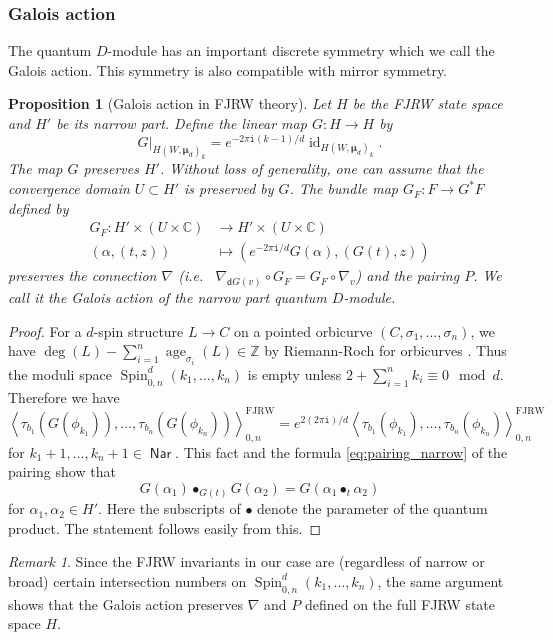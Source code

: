 \documentclass[11pt]{amsart}
\newtheorem{pro}[thm]{Proposition} %
\theoremstyle{definition} %
\theoremstyle{remark} %
\newtheorem{rem}[thm]{Remark}%
\newcommand{\CC}{\mathbb C}
\newcommand{\ZZ}{\mathbb Z}
\newcommand{\id}{\operatorname{id}}
\newcommand{\age}{\operatorname{age}}
\def\corr#1{\left\langle #1 \right\rangle}
\newcommand{\bmu}{\boldsymbol{\mu}}
\newcommand{\dd}{\mathsf{d}}
\newcommand{\Nar}{\operatorname{\mathsf{Nar}}}
\newcommand{\FJRW}{{\operatorname{FJRW}}}
\newcommand{\Spin}{\operatorname{Spin}}
\newcommand{\iu}{\mathtt{i}}
\begin{document}
\subsubsection{Galois action} 
\label{subsubsec:Galois} 
The quantum $D$-module has an important discrete symmetry 
which we call the Galois action. This symmetry 
is also compatible with mirror symmetry. 
\begin{pro}[Galois action in FJRW theory]  
\label{pro:Galois-FJRW} 
Let $H$ be the FJRW state space and $H'$ be its narrow part. 
Define the linear map $G\colon H \to H$ by 
\[
G|_{H(W,\bmu_d)_k} = e^{-2\pi\iu (k-1)/d} \id_{H(W,\bmu_d)_k}. 
\]
The map $G$ preserves $H'$. 
Without loss of generality, one can assume that 
the convergence domain $U\subset H'$ is preserved by $G$. 
The bundle map $G_F\colon F\to G^* F$ defined by  
\begin{align*}
G_F \colon H' \times (U\times \CC) & \longrightarrow 
H'\times (U\times \CC) \\
(\alpha, (t, z)) & \longmapsto 
(e^{-2\pi\iu/d} G(\alpha), (G(t),z)) 
\end{align*} 
preserves the connection $\nabla$ 
(i.e.~ $\nabla_{\dd G(v)} \circ G_F = G_F \circ \nabla_v$) 
and the pairing $P$. 
We call it the \emph{Galois action} of the narrow 
part quantum $D$-module. 
\end{pro} 
\begin{proof} 
For a $d$-spin structure $L\to C$ on a pointed orbicurve 
$(C,\sigma_1,\dots,\sigma_n)$,  
we have $\deg(L) - \sum_{i=1}^n \age_{\sigma_i}(L) \in \ZZ$ 
by Riemann-Roch for orbicurves \cite{AGV, Kawasaki, Toen}.  
Thus the moduli space $\Spin_{0,n}^d(k_1,\dots,k_n)$ is 
empty unless $2 + \sum_{i=1}^n k_i \equiv 0 \mod d$. 
Therefore we have 
\[
\corr{\tau_{b_1}(G(\phi_{k_1})),\dots,\tau_{b_n}(G(\phi_{k_n}))}
_{0,n}^{\FJRW} = e^{2(2\pi\iu)/d} 
\corr{\tau_{b_1}(\phi_{k_1}),\dots,\tau_{b_n}(\phi_{k_n})}
_{0,n}^{\FJRW} 
\]
for $k_1+1,\dots,k_n+1 \in \Nar$. 
This fact and the formula \eqref{eq:pairing_narrow} 
of the pairing show that 
\[
G(\alpha_1) \bullet_{G(t)} G(\alpha_2) = G(\alpha_1 \bullet_t \alpha_2) 
\]
for $\alpha_1,\alpha_2\in H'$. 
Here the subscripts of $\bullet$ 
denote the parameter of the quantum product. 
The statement follows easily from this.  
\end{proof} 
\begin{rem} 
\label{rem:fullGalois} 
Since the FJRW invariants in our case are (regardless of 
narrow or broad) certain intersection numbers on 
$\Spin_{0,n}^d(k_1,\dots,k_n)$, the same argument shows that 
the Galois action preserves $\nabla$ and $P$ 
defined on the full FJRW state space $H$. 
\end{rem} 
\end{document}

